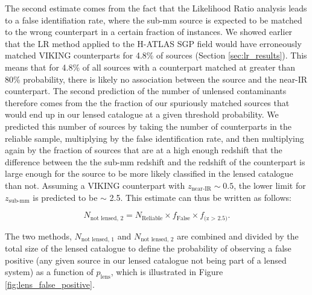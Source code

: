 The second estimate comes from the fact that the Likelihood Ratio analysis leads to a false identifiation rate, where the sub-mm source is expected to be matched to the wrong counterpart in a certain fraction of instances. We showed earlier that the LR method applied to the H-ATLAS SGP field would have erroneously matched VIKING counterparts for 4.8\% of sources (Section \ref{sec:lr_results}). This means that for 4.8\% of all sources with a counterpart matched at greater than 80\% probability, there is likely no association between the source and the near-IR counterpart. The second prediction of the number of unlensed contaminants therefore comes from the the fraction of our spuriously matched sources that would end up in our lensed catalogue at a given threshold probability. We predicted this number of sources by taking the number of counterparts in the reliable sample, multiplying by the false identification rate, and then multiplying again by the fraction of sources that are at a high enough redshift that the difference between the the sub-mm redshift and the redshift of the counterpart is large enough for the source to be more likely classified in the lensed catalogue than not. Assuming a VIKING counterpart with $z_\textrm{near-IR} \sim 0.5$, the lower limit for $z_\textrm{sub-mm}$ is predicted to be $\sim$ 2.5. This estimate can thus be written as follows:

\begin{equation}
N_{\textrm{not lensed, 2}} = N_{\textrm{Reliable}} \times f_{\textrm{False}} \times f_{\textrm{(z > 2.5)}}.
\end{equation} 

The two methods, $N_{\textrm{not lensed, 1}}$ and $N_{\textrm{not lensed, 2}}$ are combined and divided by the total size of the lensed catalogue to define the probability of observing a false positive (any given source in our lensed catalogue not being part of a lensed system) as a function of $p_{\textrm{lens}}$, which is illustrated in Figure \ref{fig:lens_false_positive}.


